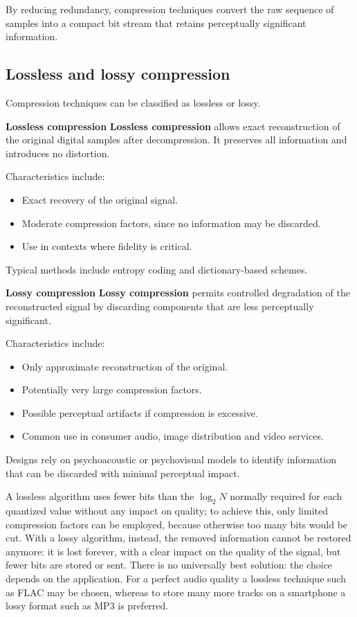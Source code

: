 \documentclass[11pt,a4paper,openany]{report}
\begin{document}
By reducing redundancy, compression techniques convert the raw sequence of samples into a compact bit stream that retains perceptually significant information.

\subsection{Lossless and lossy compression}

Compression techniques can be classified as lossless or lossy.

\textbf{Lossless compression} \textbf{Lossless compression} allows exact reconstruction of the original digital samples after decompression. It preserves all information and introduces no distortion.

Characteristics include:

\begin{itemize}
\item Exact recovery of the original signal.
\item Moderate compression factors, since no information may be discarded.
\item Use in contexts where fidelity is critical.
\end{itemize}

Typical methods include entropy coding and dictionary-based schemes.

\textbf{Lossy compression} \textbf{Lossy compression} permits controlled degradation of the reconstructed signal by discarding components that are less perceptually significant.

Characteristics include:

\begin{itemize}
\item Only approximate reconstruction of the original.
\item Potentially very large compression factors.
\item Possible perceptual artifacts if compression is excessive.
\item Common use in consumer audio, image distribution and video services.
\end{itemize}

Designs rely on psychoacoustic or psychovisual models to identify information that can be discarded with minimal perceptual impact.

A lossless algorithm uses fewer bits than the $\log_2 N$ normally required for each quantized value without any impact on quality; to achieve this, only limited compression factors can be employed, because otherwise too many bits would be cut. With a lossy algorithm, instead, the removed information cannot be restored anymore: it is lost forever, with a clear impact on the quality of the signal, but fewer bits are stored or sent. There is no universally best solution: the choice depends on the application. For a perfect audio quality a lossless technique such as FLAC may be chosen, whereas to store many more tracks on a smartphone a lossy format such as MP3 is preferred.
\end{document}
